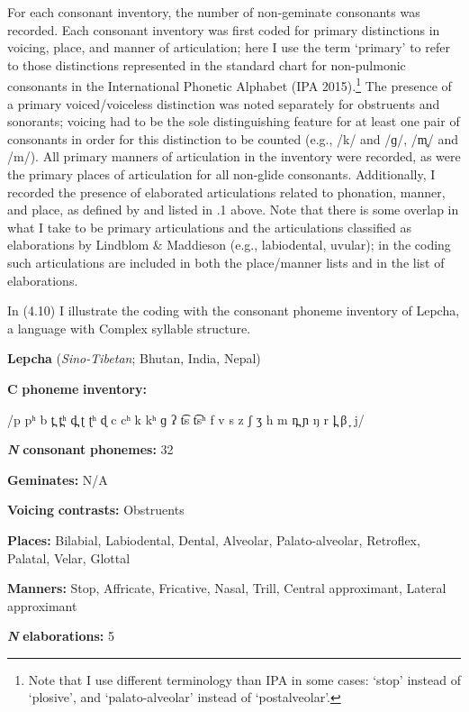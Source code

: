   For each consonant inventory, the number of non-geminate consonants was recorded. Each consonant inventory was first coded for primary distinctions in voicing, place, and manner of articulation; here I use the term ‘primary’ to refer to those distinctions represented in the standard chart for non-pulmonic consonants in the International Phonetic Alphabet (IPA 2015).\footnote{ \textrm{Note that I use different terminology than IPA in some cases: ‘stop’ instead of ‘plosive’, and ‘palato-alveolar’ instead of ‘postalveolar’.}} The presence of a primary voiced/voiceless distinction was noted separately for obstruents and sonorants; voicing had to be the sole distinguishing feature for at least one pair of consonants in order for this distinction to be counted (e.g., /k/ and /ɡ/, /m̥/ and /m/). All primary manners of articulation in the inventory were recorded, as were the primary places of articulation for all non-glide consonants. Additionally, I recorded the presence of elaborated articulations related to phonation, manner, and place, as defined by \citet{LindblomMaddieson1988} and listed in .1 above. Note that there is some overlap in what I take to be primary articulations and the articulations classified as elaborations by Lindblom \& Maddieson (e.g., labiodental, uvular); in the coding such articulations are included in both the place/manner lists and in the list of elaborations.

  In (4.10) I illustrate the coding with the consonant phoneme inventory of Lepcha, a language with Complex syllable structure.

\ea\label{ex:(4.10)}
  \textbf{Lepcha} (\textit{Sino-Tibetan}; Bhutan, India, Nepal)

\textbf{C} \textbf{phoneme} \textbf{inventory:} 

/p pʰ b t̪ t̪ʰ d̪ ʈ ʈʰ ɖ c cʰ k kʰ ɡ ʔ t͡s t͡sʰ f v s z ʃ ʒ h m n̪ ɲ ŋ r l̪ β ̞ j/

\textbf{\textit{N}} \textbf{consonant} \textbf{phonemes:} 32

\textbf{Geminates:} N/A

\textbf{Voicing} \textbf{contrasts:} Obstruents

\textbf{Places:} Bilabial, Labiodental, Dental, Alveolar, Palato-alveolar, Retroflex, Palatal, Velar, Glottal

\textbf{Manners:} Stop, Affricate, Fricative, Nasal, Trill, Central approximant, Lateral approximant

\textbf{\textit{N}} \textbf{elaborations:} 5


